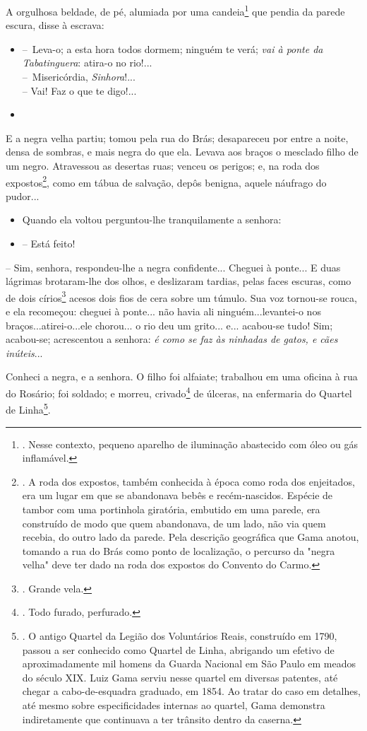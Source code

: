 A orgulhosa beldade, de pé, alumiada por uma candeia\footnote{. Nesse
  contexto, pequeno aparelho de iluminação abastecido com óleo ou gás
  inflamável.} que pendia da parede escura, disse à escrava:

\begin{itemize}
\item
  --~Leva-o; a esta hora todos dormem; ninguém te verá; \emph{vai à
  ponte da Tabatinguera}: atira-o no rio!...\\
  --~Misericórdia, \emph{Sinhora}!...\\
  -- Vai! Faz o que te digo!...
\item
\end{itemize}

E a negra velha partiu; tomou pela rua do Brás; desapareceu por entre a
noite, densa de sombras, e mais negra do que ela. Levava aos braços o
mesclado filho de um negro. Atravessou as desertas ruas; venceu os
perigos; e, na roda dos expostos\footnote{. A roda dos expostos, também
  conhecida à época como roda dos enjeitados, era um lugar em que se
  abandonava bebês e recém-nascidos. Espécie de tambor com uma
  portinhola giratória, embutido em uma parede, era construído de modo
  que quem abandonava, de um lado, não via quem recebia, do outro lado
  da parede. Pela descrição geográfica que Gama anotou, tomando a rua do
  Brás como ponto de localização, o percurso da "negra velha" deve ter
  dado na roda dos expostos do Convento do Carmo.}, como em tábua de
salvação, depôs benigna, aquele náufrago do pudor...

\begin{itemize}
\item
  Quando ela voltou perguntou-lhe tranquilamente a senhora:
\item
  -- Está feito!
\end{itemize}

-- Sim, senhora, respondeu-lhe a negra confidente... Cheguei à ponte...
E duas lágrimas brotaram-lhe dos olhos, e deslizaram tardias, pelas
faces escuras, como de dois círios\footnote{. Grande vela.} acesos dois
fios de cera sobre um túmulo. Sua voz tornou-se rouca, e ela recomeçou:
cheguei à ponte... não havia ali ninguém...levantei-o nos
braços...atirei-o...ele chorou... o rio deu um grito... e... acabou-se
tudo! Sim; acabou-se; acrescentou a senhora: \emph{é como se faz às
ninhadas de gatos, e cães inúteis}...

Conheci a negra, e a senhora. O filho foi alfaiate; trabalhou em uma
oficina à rua do Rosário; foi soldado; e morreu, crivado\footnote{. Todo
  furado, perfurado.} de úlceras, na enfermaria do Quartel de
Linha\footnote{. O antigo Quartel da Legião dos Voluntários Reais,
  construído em 1790, passou a ser conhecido como Quartel de Linha,
  abrigando um efetivo de aproximadamente mil homens da Guarda Nacional
  em São Paulo em meados do século XIX. Luiz Gama serviu nesse quartel
  em diversas patentes, até chegar a cabo-de-esquadra graduado, em 1854.
  Ao tratar do caso em detalhes, até mesmo sobre especificidades
  internas ao quartel, Gama demonstra indiretamente que continuava a ter
  trânsito dentro da caserna.}.


